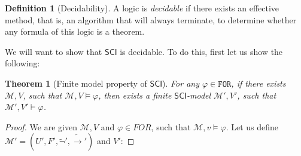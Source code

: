 \documentclass{article}
\newtheorem{theorem}{Theorem}
\theoremstyle{definition}
\newtheorem{definition}{Definition}[section]
\newcommand*{\ra}{\rightarrow}
\newcommand*{\FOR}{\texttt{FOR}}
\newcommand*{\SUB}{\texttt{SUB}}
\newcommand{\SCI}{$\mathsf{SCI}$\xspace}
\begin{document}
\begin{definition}[Decidability]
    A logic is \emph{decidable} if there exists an effective method, that is, an algorithm that will always terminate, to determine whether any formula of this logic is a theorem.
\end{definition}

We will want to show that \SCI is decidable. To do this, first let us show the
following:

\begin{theorem}[Finite model property of \SCI]
    For any $\varphi \in \FOR$, if there exists $\mathcal{M},V$, such that $\mathcal{M},V \models \varphi$, then exists a finite \SCI-model $\mathcal{M'},V'$, such that $\mathcal{M'},V'\models \varphi$.
\end{theorem}
\begin{proof}
    We are given $\mathcal{M}, V$ and $\varphi \in FOR$, such that $\mathcal{M}, v \models \varphi$. Let us define $\mathcal{M'} = (U', F', \tilde{\lnot}', \tilde{\ra}')$ and $V'$:
\end{proof}
\end{document}
